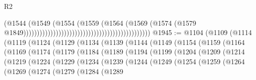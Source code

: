 \begin{lexlean}{R2}
\begin{coremodule}
                                                                                  (@1544
                                                                                    (@1549
                                                                                      (@1554
                                                                                        (@1559
                                                                                          (@1564
                                                                                            (@1569
                                                                                              (@1574
                                                                                                (@1579
                                                                                                  @1849)))))))))))))))))))))))))))))))))))))))))))))))
@1945 := @1104
    (@1109
      (@1114
        (@1119
          (@1124
            (@1129
              (@1134
                (@1139
                  (@1144
                    (@1149
                      (@1154
                        (@1159
                          (@1164
                            (@1169
                              (@1174
                                (@1179
                                  (@1184
                                    (@1189
                                      (@1194
                                        (@1199
                                          (@1204
                                            (@1209
                                              (@1214
                                                (@1219
                                                  (@1224
                                                    (@1229
                                                      (@1234
                                                        (@1239
                                                          (@1244
                                                            (@1249
                                                              (@1254
                                                                (@1259
                                                                  (@1264
                                                                    (@1269
                                                                      (@1274
                                                                        (@1279
                                                                          (@1284
                                                                            (@1289

\end{coremodule}
\end{lexlean}
